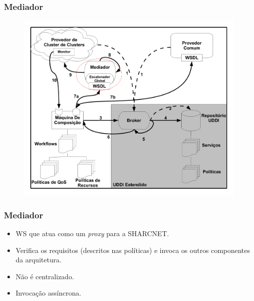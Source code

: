 \documentclass[red, cover=invisible, theme=Warsaw]{myslides}
\begin{document}
	\begin{frame} \frametitle{Mediador}
	    \begin{center}
		\begin{figure}
		\includegraphics[scale=0.25]{imagens/execComposicaoA-4.pdf}	    
		\end{figure}
	    \end{center}
	\end{frame}

	\begin{frame} \frametitle{Mediador}
	    \begin{itemize}
		\item WS que atua como um \textit{proxy} para a SHARCNET.
		\item Verifica os requisitos (descritos nas políticas) e invoca os outros componentes da arquitetura.
		\item Não é centralizado.
		\item Invocação assíncrona.
	    \end{itemize}
	\end{frame}
	
\end{document}
